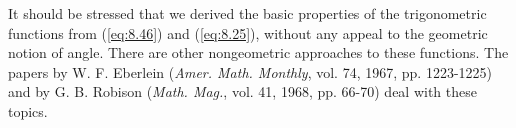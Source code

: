 It should be stressed that we derived the basic properties of the trigonometric functions from (\ref{eq:8.46}) and (\ref{eq:8.25}), 
without any appeal to the geometric notion of angle. 
There are other nongeometric approaches to these functions. 
The papers by W. F. Eberlein (\emph{Amer. Math. Monthly}, vol. 74, 1967, pp. 1223-1225)
and by G. B. Robison (\emph{Math. Mag.}, vol. 41, 1968, pp. 66-70) deal with these topics.

